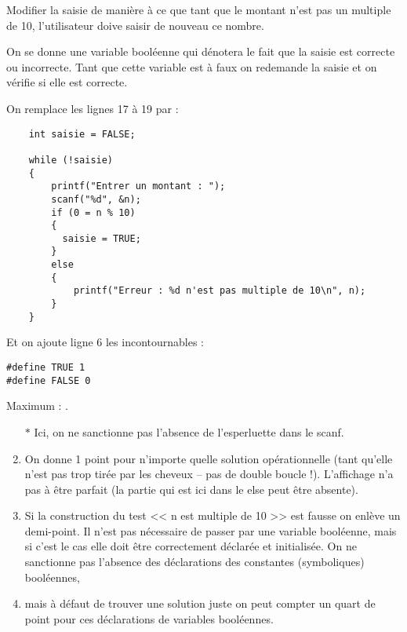 \question Modifier la saisie de manière à ce que tant que le montant n'est
pas un multiple de 10, l'utilisateur doive saisir de nouveau ce nombre. 

\begin{correction}

On se donne une variable booléenne qui dénotera le fait que la saisie est
correcte ou incorrecte. Tant que cette variable est à faux on
redemande la saisie et on vérifie si elle est correcte. 

  On remplace les lignes 17 à 19 par :

\begin{small}
\begin{verbatim}
    int saisie = FALSE;

    while (!saisie)
    {
        printf("Entrer un montant : ");
        scanf("%d", &n); 
        if (0 = n % 10)
        {
          saisie = TRUE;   
        }
        else
        {
            printf("Erreur : %d n'est pas multiple de 10\n", n);
        }
    }
\end{verbatim}
\end{small}

Et on ajoute ligne 6 les incontournables :
\begin{small}
\begin{verbatim}
#define TRUE 1
#define FALSE 0
\end{verbatim}
\end{small}
\end{correction}

\begin{baremeenv}

Maximum : .
  \begin{enumerate}[ (a)]
  \item[$\ast$]   Ici, on ne sanctionne pas l'absence de l'esperluette
    dans le scanf.
  \item {}
  On donne 1 point pour n'importe quelle solution opérationnelle (tant
  qu'elle n'est pas trop tirée par les cheveux -- pas de double boucle
  !). L'affichage n'a pas à être parfait (la partie qui est ici dans le else peut
  être absente). 
\item {} Si la construction du test << n est multiple de 10 >>
  est fausse on enlève un demi-point. Il n'est pas nécessaire de
  passer par une variable booléenne, mais si c'est le cas elle doit
  être correctement déclarée et initialisée. On ne sanctionne pas
  l'absence des déclarations des constantes (symboliques) booléennes,
\item {} mais à défaut de trouver une solution juste on peut compter un quart
  de point pour ces déclarations de variables booléennes.
  \end{enumerate}
\end{baremeenv}


